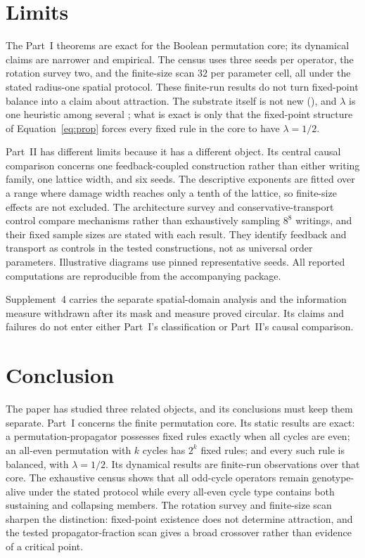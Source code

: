 \documentclass[man,12pt,floatsintext,donotrepeattitle]{apa7}
\newcommand{\secref}[1]{\emph{\nameref{#1}}}
\begin{document}
\section{Limits}
\label{sec:limits}

The Part~I theorems are exact for the Boolean permutation core; its dynamical
claims are narrower and empirical. The census uses three seeds per operator,
the rotation survey two, and the finite-size scan $32$ per parameter cell, all
under the stated radius-one spatial protocol. These finite-run results do not
turn fixed-point balance into a claim about attraction. The substrate itself is
not new (\secref{sec:object}), and $\lambda$ is one heuristic among several
\parencite{wuensche1999classifying}; what is exact is only that the fixed-point
structure of Equation~\eqref{eq:prop} forces every fixed rule in the core to
have $\lambda=1/2$.

Part~II has different limits because it has a different object. Its central
causal comparison concerns one feedback-coupled construction rather than
either writing family, one lattice width, and six seeds. The descriptive
exponents are fitted over a range where damage width reaches only a tenth of
the lattice, so finite-size effects are not excluded. The architecture survey
and conservative-transport control compare mechanisms rather than exhaustively
sampling $8^8$ writings, and their fixed sample sizes are stated with each
result. They identify feedback and transport as controls in the tested
constructions, not as universal order parameters. Illustrative diagrams use
pinned representative seeds. All reported computations are reproducible from
the accompanying package.

Supplement~4 carries the separate spatial-domain analysis and the information
measure withdrawn after its mask and measure proved circular. Its claims and
failures do not enter either Part~I's classification or Part~II's causal
comparison.

\section{Conclusion}
\label{sec:conclusion}

The paper has studied three related objects, and its conclusions must keep them
separate. Part~I concerns the finite permutation core. Its static results are
exact: a permutation-propagator possesses fixed rules exactly when all cycles
are even; an all-even permutation with $k$ cycles has $2^k$ fixed rules; and
every such rule is balanced, with $\lambda=1/2$. Its dynamical results are
finite-run observations over that core. The exhaustive census shows that all
odd-cycle operators remain genotype-alive under the stated protocol while
every all-even cycle type contains both sustaining and collapsing members. The
rotation survey and finite-size scan sharpen the distinction: fixed-point
existence does not determine attraction, and the tested propagator-fraction
scan gives a broad crossover rather than evidence of a critical point.
\end{document}

